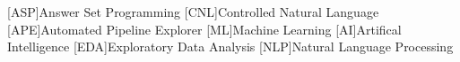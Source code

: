 
\begin{acronym}[ASP]
    [ASP]{Answer Set Programming}
    [CNL]{Controlled Natural Language}
    [APE]{Automated Pipeline Explorer}
    [ML]{Machine Learning}
    [AI]{Artifical Intelligence}
    [EDA]{Exploratory Data Analysis}
    [NLP]{Natural Language Processing}
\end{acronym}